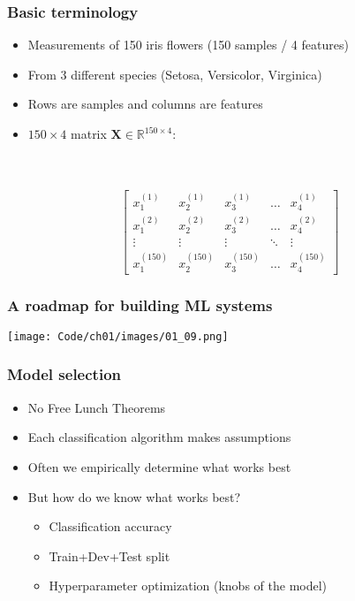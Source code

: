 \documentclass{beamer}
\begin{document}
\begin{frame}
  \frametitle{Basic terminology}
  \begin{itemize}
  \item Measurements of 150 iris flowers (150 samples / 4 features)
  \item From 3 different species (Setosa, Versicolor, Virginica)
  \item Rows are samples and columns are features
  \item $150 \times 4$ matrix $\mathbf{X} \in \mathbb{R}^{150 \times 4}:$
  \end{itemize}
  \\~\\
  \[
  \begin{bmatrix}
    x_{1}^{(1)} & x_{2}^{(1)} & x_{3}^{(1)} & \dots  & x_{4}^{(1)} \\
    x_{1}^{(2)} & x_{2}^{(2)} & x_{3}^{(2)} & \dots  & x_{4}^{(2)} \\
    \vdots & \vdots & \vdots & \ddots & \vdots \\
    x_{1}^{(150)} & x_{2}^{(150)} & x_{3}^{(150)} & \dots  & x_{4}^{(150)}
  \end{bmatrix}
  \]
\end{frame}

\begin{frame}
  \frametitle{A roadmap for building ML systems}
  \texttt{[image: Code/ch01/images/01\_09.png]}
\end{frame}

\begin{frame}
  \frametitle{Model selection}
  \begin{itemize}
  \item No Free Lunch Theorems
  \item Each classification algorithm makes assumptions
  \item Often we empirically determine what works best
  \item But how do we know what works best?
    \begin{itemize}
    \item Classification accuracy
    \item Train+Dev+Test split
    \item Hyperparameter optimization (knobs of the model)
    \end{itemize}
  \end{itemize}
\end{frame}
\end{document}
